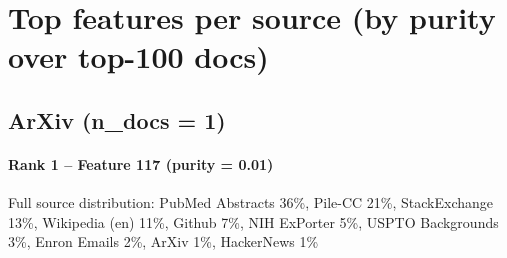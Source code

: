 \section*{Top features per source (by purity over top-100 docs)}

\subsection*{ArXiv (n\_docs = 1)}

\paragraph*{Rank 1 -- Feature 117 (purity = 0.01)}

Full source distribution: PubMed Abstracts 36\%, Pile-CC 21\%, StackExchange 13\%, Wikipedia (en) 11\%, Github 7\%, NIH ExPorter 5\%, USPTO Backgrounds 3\%, Enron Emails 2\%, ArXiv 1\%, HackerNews 1\%

